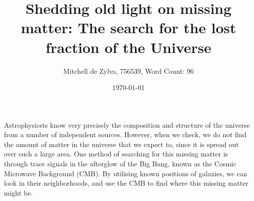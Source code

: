 \documentclass[12pt]{extarticle}
\title{Shedding old light on missing matter: The search for the lost fraction of the Universe}
\author{Mitchell de Zylva, 756539, Word Count: 96}
\date{\today}
\begin{document}
\maketitle

Astrophysicsts know very precisely the composition and structure of the universe from a number of independent sources. However, when we check, we do not find the amount of matter in the universe that we expect to, since it is spread out over such a large area. One method of searching for this missing matter is through trace signals in the afterglow of the Big Bang, known as the Cosmic Microwave Background (CMB). By utilising known positions of galaxies, we can look in their neighborhoods, and use the CMB to find where this missing matter might be. 
\end{document}
